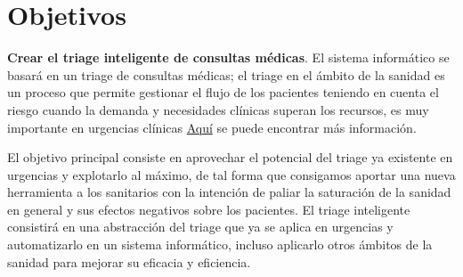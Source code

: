 \section{Objetivos}

\textbf{Crear el triage inteligente de consultas médicas}. El sistema informático se basará en un triage de consultas médicas; el triage en el ámbito
 de la sanidad es un proceso que permite gestionar el flujo de los pacientes teniendo en cuenta el riesgo cuando la demanda y necesidades clínicas
 superan los recursos, es muy importante en urgencias clínicas \href{https://scielo.isciii.es/scielo.php?script=sci_arttext&pid=S1137-66272010000200008}{Aquí}
 se puede encontrar más información.

 El objetivo principal consiste en aprovechar el potencial del triage ya existente en urgencias y explotarlo al máximo, de tal forma que
 consigamos aportar una nueva herramienta a los sanitarios con la intención de paliar la saturación de la sanidad en general y sus efectos negativos sobre los pacientes.
 El triage inteligente consistirá en una abstracción del triage que ya se aplica en urgencias y automatizarlo en un sistema informático, incluso aplicarlo
 otros ámbitos de la sanidad para mejorar su eficacia y eficiencia.


